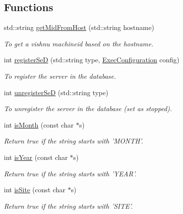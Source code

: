 \subsection*{Functions}
\begin{DoxyCompactItemize}
\item 
std::string \hyperlink{namespacevishnu_af78f0170fec9be36ee34f702cbd7ab28}{getMidFromHost} (std::string hostname)
\begin{DoxyCompactList}\small\item\em To get a vishnu machineid based on the hostname. \item\end{DoxyCompactList}\item 
int \hyperlink{namespacevishnu_acc83b00c8c11d7ae44a4dee1b8bf66f3}{registerSeD} (std::string type, \hyperlink{classExecConfiguration}{ExecConfiguration} config)
\begin{DoxyCompactList}\small\item\em To register the server in the database. \item\end{DoxyCompactList}\item 
int \hyperlink{namespacevishnu_a3b8e27715f0676ef58a806f2cc5e365c}{unregisterSeD} (std::string type)
\begin{DoxyCompactList}\small\item\em To unregister the server in the database (set as stopped). \item\end{DoxyCompactList}\item 
int \hyperlink{namespacevishnu_ae3f61f1465ef34d3cf2f20c67a019b43}{isMonth} (const char $\ast$s)
\begin{DoxyCompactList}\small\item\em Return true if the string starts with 'MONTH'. \item\end{DoxyCompactList}\item 
int \hyperlink{namespacevishnu_a646794297931366c08502e5079154ccd}{isYear} (const char $\ast$s)
\begin{DoxyCompactList}\small\item\em Return true if the string starts with 'YEAR'. \item\end{DoxyCompactList}\item 
int \hyperlink{namespacevishnu_a36b8edc2218c332a4a59f2e39109d627}{isSite} (const char $\ast$s)
\begin{DoxyCompactList}\small\item\em Return true if the string starts with 'SITE'. \item\end{DoxyCompactList}\item 

\end{DoxyCompactItemize}
